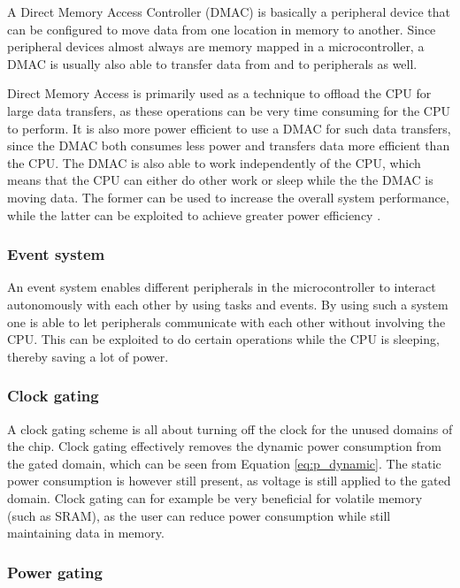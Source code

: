 A Direct Memory Access Controller (DMAC) is basically a peripheral device that can be configured to move data from one location in memory to another. Since peripheral devices almost always are memory mapped in a microcontroller, a DMAC is usually also able to transfer data from and to peripherals as well. 

Direct Memory Access is primarily used as a technique to offload the CPU for large data transfers, as these operations can be very time consuming for the CPU to perform. It is also more power efficient to use a DMAC for such data transfers, since the DMAC both consumes less power and transfers data more efficient than the CPU. The DMAC is also able to work independently of the CPU, which means that the CPU can either do other work or sleep while the the DMAC is moving data. The former can be used to increase the overall system performance, while the latter can be exploited to achieve greater power efficiency \cite{ball03}.

\subsubsection{Event system}

An event system enables different peripherals in the microcontroller to interact autonomously with each other by using tasks and events. By using such a system one is able to let peripherals communicate with each other without involving the CPU. This can be exploited to do certain operations while the CPU is sleeping, thereby saving a lot of power.

\subsubsection{Clock gating}

A clock gating scheme is all about turning off the clock for the unused domains of the chip. Clock gating effectively removes the dynamic power consumption from the gated domain, which can be seen from Equation \ref{eq:p_dynamic}. The static power consumption is however still present, as voltage is still applied to the gated domain. Clock gating can for example be very beneficial for volatile memory (such as SRAM), as the user can reduce power consumption while still maintaining data in memory.

\subsubsection{Power gating}

